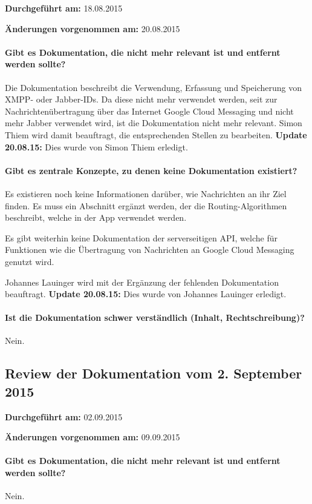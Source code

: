 \textbf{Durchgeführt am:} 18.08.2015

\textbf{Änderungen vorgenommen am:} 20.08.2015

\paragraph{Gibt es Dokumentation, die nicht mehr relevant ist und entfernt werden sollte?}
Die Dokumentation beschreibt die Verwendung, Erfassung und Speicherung von XMPP- oder Jabber-IDs. Da diese nicht mehr verwendet werden, seit zur Nachrichtenübertragung über das Internet Google Cloud Messaging und nicht mehr Jabber verwendet wird, ist die Dokumentation nicht mehr relevant. Simon Thiem wird damit beauftragt, die entsprechenden Stellen zu bearbeiten. \textbf{Update 20.08.15:} Dies wurde von Simon Thiem erledigt.

\paragraph{Gibt es zentrale Konzepte, zu denen keine Dokumentation existiert?}
Es existieren noch keine Informationen darüber, wie Nachrichten an ihr Ziel finden. Es muss ein Abschnitt ergänzt werden, der die Routing-Algorithmen beschreibt, welche in der App verwendet werden.

Es gibt weiterhin keine Dokumentation der serverseitigen API, welche für Funktionen wie die Übertragung von Nachrichten an Google Cloud Messaging genutzt wird.

Johannes Lauinger wird mit der Ergänzung der fehlenden Dokumentation beauftragt. \textbf{Update 20.08.15:} Dies wurde von Johannes Lauinger erledigt.

\paragraph{Ist die Dokumentation schwer verständlich (Inhalt, Rechtschreibung)?}
Nein.


\subsection{Review der Dokumentation vom 2. September 2015}

\textbf{Durchgeführt am:} 02.09.2015

\textbf{Änderungen vorgenommen am:} 09.09.2015

\paragraph{Gibt es Dokumentation, die nicht mehr relevant ist und entfernt werden sollte?}
Nein.


